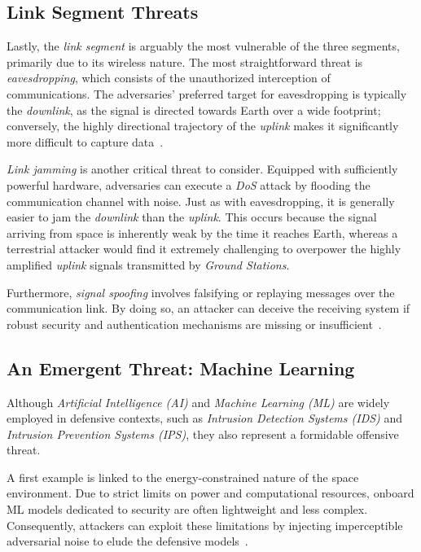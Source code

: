 \documentclass[11pt,a4paper]{report}
\begin{document}
\subsection{Link Segment Threats}
Lastly, the \textit{link segment} is arguably the most vulnerable of the three segments, primarily due to its wireless nature. 
The most straightforward threat is \textit{eavesdropping}, which consists of the unauthorized interception of communications. 
The adversaries' preferred target for eavesdropping is typically the \textit{downlink}, as the signal is directed towards Earth over a wide footprint; 
conversely, the highly directional trajectory of the \textit{uplink} makes it significantly more difficult to capture data~\cite[p.~393]{aLotOfReferences}.

\textit{Link jamming} is another critical threat to consider. Equipped with sufficiently powerful hardware, adversaries can execute a \textit{DoS} attack by flooding the communication channel with noise. 
Just as with eavesdropping, it is generally easier to jam the \textit{downlink} than the \textit{uplink}. 
This occurs because the signal arriving from space is inherently weak by the time it reaches Earth, whereas a terrestrial attacker would find it extremely challenging to overpower the highly amplified \textit{uplink} signals transmitted by \textit{Ground Stations}.

Furthermore, \textit{signal spoofing} involves falsifying or replaying messages over the communication link. 
By doing so, an attacker can deceive the receiving system if robust security and authentication mechanisms are missing or insufficient~\cite[p.~391--394]{aLotOfReferences}.

\subsection{An Emergent Threat: Machine Learning}
Although \textit{Artificial Intelligence (AI)} and \textit{Machine Learning (ML)} are widely employed in defensive contexts, 
such as \textit{Intrusion Detection Systems (IDS)} and \textit{Intrusion Prevention Systems (IPS)}, they also represent a formidable offensive threat.

A first example is linked to the energy-constrained nature of the space environment. Due to strict limits on power and computational resources, onboard ML models dedicated to security are often lightweight and less complex. 
Consequently, attackers can exploit these limitations by injecting imperceptible adversarial noise to elude the defensive models~\cite[p.~5682]{LEO_MEO_GEO}.
\end{document}
